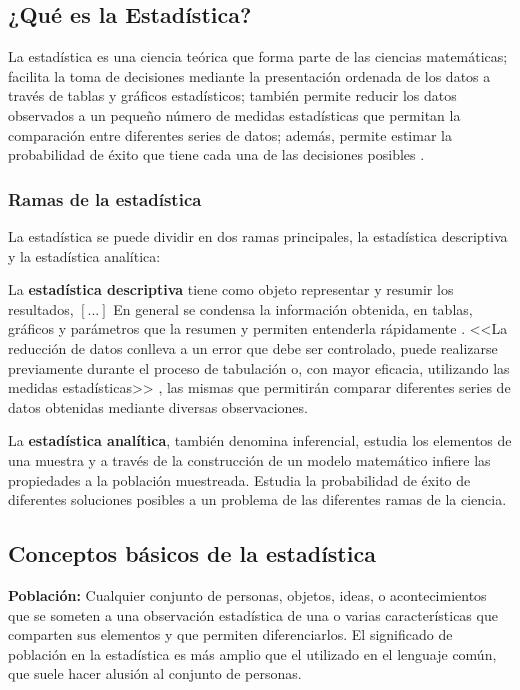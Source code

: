 \documentclass[a5paper,doc,10pt,noapacite]{apa6}
\begin{document}
{{\newpage
\subsection{¿Qué es la Estadística?} 

La estadística es una ciencia teórica que forma parte de las ciencias matemáticas; facilita la toma de decisiones mediante la presentación ordenada de los datos a través de tablas y gráficos estadísticos; también permite reducir los datos observados a un pequeño número de medidas estadísticas que permitan la comparación entre diferentes series de datos; además, permite estimar la probabilidad de éxito que tiene cada una de las decisiones posibles \cite{Fernandez-2002}.

\subsubsection{Ramas de la estadística}

La estadística se puede dividir en dos ramas principales, la estadística descriptiva y la estadística analítica:

\vspace{1\baselineskip}
La \textbf{estadística descriptiva} tiene como objeto representar y resumir los resultados, \([...]\) En general se condensa la información obtenida, en tablas, gráficos y parámetros que la resumen y permiten entenderla rápidamente \cite{Vargas-1995}. <<La reducción de datos conlleva a un error que debe ser controlado, puede realizarse previamente durante el proceso de tabulación o, con mayor eficacia, utilizando las medidas estadísticas>> \cite{Fernandez-2002}, las mismas que permitirán comparar diferentes series de datos obtenidas mediante diversas observaciones.

La \textbf{estadística analítica}, también denomina inferencial, estudia los elementos de una muestra y a través de la construcción de un modelo matemático infiere las propiedades a la población muestreada. Estudia la probabilidad de éxito de diferentes soluciones posibles a un problema de las diferentes ramas de la ciencia.

\subsection{Conceptos básicos de la estadística}

\textbf{Población:} Cualquier conjunto de personas, objetos, ideas, o acontecimientos que se someten a una observación estadística de una o varias características que comparten sus elementos y que permiten diferenciarlos. El significado de población en la estadística es más amplio que el utilizado en el lenguaje común, que suele hacer alusión al conjunto de personas.

}}
\end{document}
